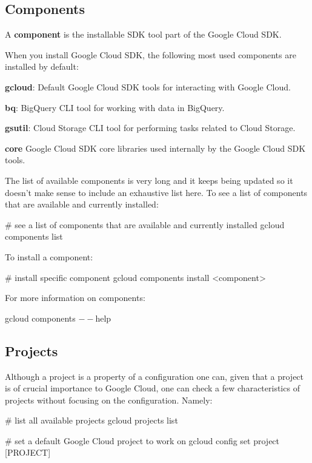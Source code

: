 \subsection{Components}

\bd[Component]
A \textbf{component} is the installable SDK tool part of the Google Cloud SDK.
\ed

When you install Google Cloud SDK, the following most used components are installed by default:
\bit
\item \textbf{gcloud}: Default Google Cloud SDK tools for interacting with Google Cloud.
\item \textbf{bq}: BigQuery CLI tool for working with data in BigQuery.
\item \textbf{gsutil}: Cloud Storage CLI tool for performing tasks related to Cloud Storage.
\item \textbf{core} Google Cloud SDK core libraries used internally by the Google Cloud SDK tools.
\eit

The list of available components is very long and it keeps being updated so it doesn't make sense to include
an exhaustive list here. To see a list of components that are available and currently installed:
\begin{bash}
# see a list of components that are available and currently installed
gcloud components list
\end{bash}

To install a component:
\begin{bash}
# install specific component
gcloud components install <component>
\end{bash}

For more information on components:
\begin{bash}
gcloud components $--$help
\end{bash}

\subsection{Projects}

Although a project is a property of a configuration one can, given that a project is of crucial importance to Google
Cloud, one can check a few characteristics of projects without focusing on the configuration. Namely:
\begin{bash}
# list all available projects
gcloud projects list
\end{bash}

\begin{bash}
# set a default Google Cloud project to work on
gcloud config set project [PROJECT]
\end{bash}

